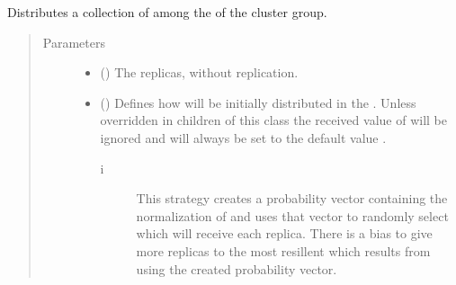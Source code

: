 \documentclass[letterpaper,10pt,english]{sphinxmanual}
\begin{document}
\begin{fulllineitems}
\begin{fulllineitems}
\label{\detokenize{app.domain:app.domain.cluster_groups.Cluster.spread_files}}
Distributes a collection of {\hyperref[\detokenize{app.domain.helpers:app.domain.helpers.smart_dataclasses.FileBlockData}]{}} among the
{\hyperref[\detokenize{app.domain:app.domain.cluster_groups.Cluster.members}]{}} of the cluster group.
\begin{quote}\begin{description}
\item[{Parameters}] \leavevmode\begin{itemize}
\item {} 
 ({\hyperref[\detokenize{app:app.type_hints.ReplicasDict}]{}}) \textendash{} The {\hyperref[\detokenize{app.domain.helpers:app.domain.helpers.smart_dataclasses.FileBlockData}]{}}
replicas, without replication.

\item {} 
 () \textendash{} 
Defines how  will be initially distributed in
the . Unless overridden in children of this class the
received value of  will be ignored and will always
be set to the default value .
\begin{description}
\item[{i}] \leavevmode
This strategy creates a probability vector
containing the normalization of {\hyperref[\detokenize{app.domain:app.domain.network_nodes.Node.uptime}]{}} and uses
that vector to randomly select which
{\hyperref[\detokenize{app.domain:app.domain.network_nodes.Node}]{}} will
receive each replica. There is a bias to give more
replicas to the most resillent {\hyperref[\detokenize{app.domain:app.domain.network_nodes.Node}]{}} which results from
using the created probability vector.


\end{description}
\end{itemize}
\end{description}
\end{quote}
\end{fulllineitems}
\end{fulllineitems}
\end{document}
